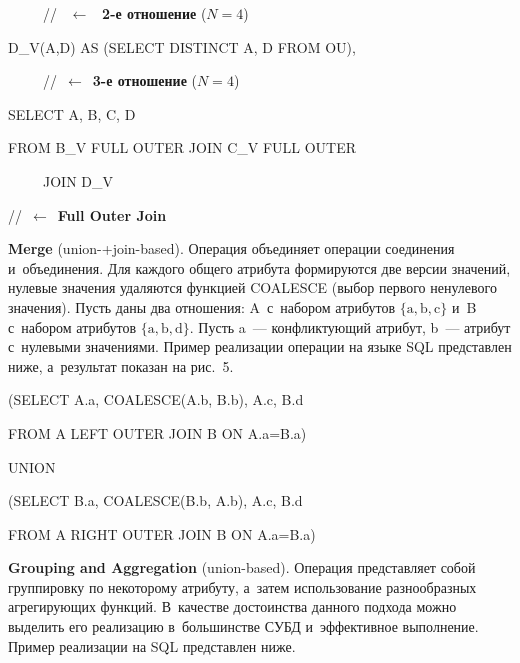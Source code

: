 \begin{multicols}{2}
  \noindent
\ \ \ \ \  // \ $\leftarrow$\ \textbf{ 2-е отношение} ($N=4$)

\noindent
  {\sf \hspace*{3pt}D\_V(A,D) AS (SELECT DISTINCT A, D FROM OU),}

\noindent
\ \ \ \ \ //\ $\leftarrow$\ \textbf{3-е отношение} ($N=4$)

\noindent
  {\sf SELECT A, B, C, D}

\noindent
  {\sf FROM B\_V FULL OUTER JOIN C\_V FULL OUTER

  \noindent
  \ \ \ \ \  JOIN D\_V}
  //\ $\leftarrow$\ \textbf{Full Outer Join}

 \textbf{Merge} (union-\;+\;join-based). Операция объединяет операции соединения
и~объединения. Для каждого общего атрибута формируются две версии значений, нулевые
значения удаляются функцией COALESCE (выбор первого ненулевого значения). Пусть
даны два отношения: A~с~набором атрибутов $\{\mathrm{a, b, c}\}$ и~B с~набором
атрибутов $\{\mathrm{a, b, d}\}$. Пусть a~--- конфликтующий атрибут, b~--- атрибут
с~нулевыми значениями. Пример реализации операции на языке SQL представлен ниже,
а~результат показан на рис.~5.

\noindent
{\sf   (SELECT A.a, COALESCE(A.b, B.b), A.c, B.d}

\noindent
  {\sf FROM A LEFT OUTER JOIN B ON A.a\;=\;B.a)}

\noindent
{\sf   UNION}

\noindent
{\sf   (SELECT B.a, COALESCE(B.b, A.b), A.c, B.d}

\noindent
{\sf   FROM A RIGHT OUTER JOIN B ON A.a\;=\;B.a)}



  \textbf{Grouping and Aggregation} (union-based). Операция представляет собой
группировку по некоторому атрибуту, а~затем использование разнообразных агрегирующих
функций. В~качестве достоинства данного подхода можно выделить его реализацию
в~большинстве СУБД и~эффективное выполнение. Пример реализации на SQL представлен
ниже.

  \begin{figure*} %
  \vspace*{1pt}
 \begin{center}
 \mbox{%
 \epsfxsize=128.851mm
 }
 \end{center}
 \vspace*{-9pt}
  \end{figure*}



\end{multicols}
